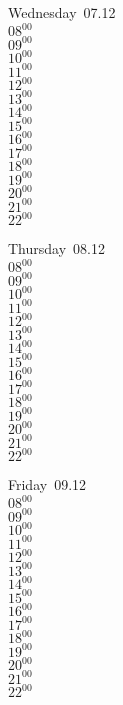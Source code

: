 \documentclass[11pt,a4paper]{book}\usepackage[]{graphicx}\usepackage[]{color}
\begin{document}
\begin{weekdaybox}
  Wednesday~07.12\\
  { 
  \vfill
  $08^{00}$\\
$09^{00}$\\
$10^{00}$\\
$11^{00}$\\
$12^{00}$\\
$13^{00}$\\
$14^{00}$\\
$15^{00}$\\
$16^{00}$\\
$17^{00}$\\
$18^{00}$\\
$19^{00}$\\
$20^{00}$\\
$21^{00}$\\
$22^{00}$\\
  }
\end{weekdaybox}
\clearpage
\begin{headerbox}
\end{headerbox}
\begin{weekdaybox}
  Thursday~08.12\\
  { 
  \vfill
  $08^{00}$\\
$09^{00}$\\
$10^{00}$\\
$11^{00}$\\
$12^{00}$\\
$13^{00}$\\
$14^{00}$\\
$15^{00}$\\
$16^{00}$\\
$17^{00}$\\
$18^{00}$\\
$19^{00}$\\
$20^{00}$\\
$21^{00}$\\
$22^{00}$\\
  }
\end{weekdaybox} 
\begin{weekdaybox}
  Friday~09.12\\
  { 
  \vfill
  $08^{00}$\\
$09^{00}$\\
$10^{00}$\\
$11^{00}$\\
$12^{00}$\\
$13^{00}$\\
$14^{00}$\\
$15^{00}$\\
$16^{00}$\\
$17^{00}$\\
$18^{00}$\\
$19^{00}$\\
$20^{00}$\\
$21^{00}$\\
$22^{00}$\\
  }
\end{weekdaybox}
\end{document}
